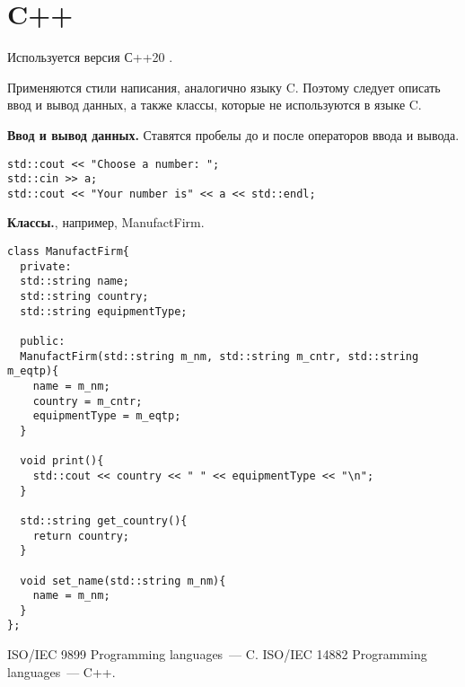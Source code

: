 \documentclass{article}
\begin{document}
\section{C++}
Используется версия С++20 \cite{C++}.\vspace{5mm}

Применяются стили написания, аналогично языку C. Поэтому следует описать ввод и вывод данных, а также классы, которые не используются в языке C.\par
\textbf{Ввод и вывод данных.} Ставятся пробелы до и после операторов ввода и вывода.
\begin{lstlisting}[caption=Ввод и вывод данных.]
std::cout << "Choose a number: ";
std::cin >> a;
std::cout << "Your number is" << a << std::endl;
\end{lstlisting}

\textbf{Классы.}, например, ManufactFirm.
\begin{lstlisting}[caption=Классы.]
class ManufactFirm{
  private:
  std::string name;
  std::string country;
  std::string equipmentType;

  public:
  ManufactFirm(std::string m_nm, std::string m_cntr, std::string m_eqtp){
    name = m_nm;
    country = m_cntr;
    equipmentType = m_eqtp;
  }

  void print(){
    std::cout << country << " " << equipmentType << "\n";
  }

  std::string get_country(){
    return country;
  }

  void set_name(std::string m_nm){
    name = m_nm;
  }
};
\end{lstlisting}

\begin{thebibliography}{}
ISO/IEC 9899 Programming languages~--- C.
ISO/IEC 14882 Programming languages~--- C++.
\end{thebibliography}
\end{document}
